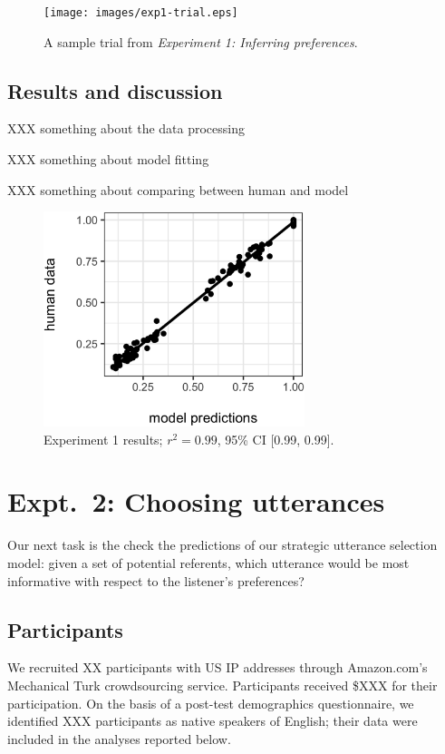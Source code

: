 \documentclass[10pt,a4paper]{article}
\begin{document}
\begin{figure}[ht]
	\centering
	\texttt{[image: images/exp1-trial.eps]}
	\caption{A sample trial from \emph{Experiment 1: Inferring preferences}.}\label{exp1-trial}
\end{figure}

\subsection{Results and discussion}

XXX something about the data processing

XXX something about model fitting

XXX something about comparing between human and model

\begin{figure}[ht]
	\centering
	\includegraphics[width=3in]{images/X2-scatter-CogSci.eps}
	\caption{Experiment 1 results; $r^{2}=0.99$, 95\% CI [0.99, 0.99].}\label{exp1-results}
\end{figure}


\section{Expt.~2: Choosing utterances}

Our next task is the check the predictions of our strategic utterance selection model: given a set of potential referents, which utterance would be most informative with respect to the listener's preferences?

\subsection{Participants}

We recruited XX participants with US IP addresses through Amazon.com's Mechanical Turk crowdsourcing service. Participants received \$XXX for their participation. On the basis of a post-test demographics questionnaire, we identified XXX participants as native speakers of English; their data were included in the analyses reported below.
\end{document}
